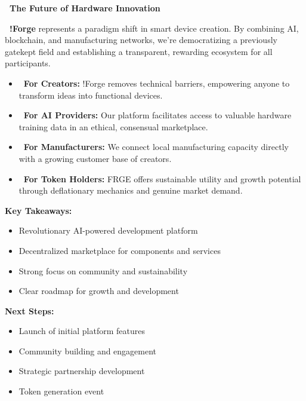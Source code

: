 \begin{center}
\large{\textcolor{fabPrimary}{\textbf{\faLightbulbO\ The Future of Hardware Innovation}}}
\end{center}

\vspace{0.5em}

\textbf{\textcolor{fabPrimary}{\faGears\ !Forge}} represents a paradigm shift in smart device creation. By combining AI, blockchain, and manufacturing networks, we're democratizing a previously gatekept field and establishing a transparent, rewarding ecosystem for all participants.

\vspace{0.5em}

\begin{itemize}[leftmargin=*]
    \item \textbf{\textcolor{fabPrimary}{\faUsers\ For Creators:}} !Forge removes technical barriers, empowering anyone to transform ideas into functional devices.
    
    \item \textbf{\textcolor{fabPrimary}{\faCog\ For AI Providers:}} Our platform facilitates access to valuable hardware training data in an ethical, consensual marketplace.
    
    \item \textbf{\textcolor{fabPrimary}{\faIndustry\ For Manufacturers:}} We connect local manufacturing capacity directly with a growing customer base of creators.
    
    \item \textbf{\textcolor{fabPrimary}{\faBitcoin\ For Token Holders:}} FRGE offers sustainable utility and growth potential through deflationary mechanics and genuine market demand.
\end{itemize}

\vspace{0.5em}

\begin{center}
\end{center}

\vspace{0.5cm}
\noindent\textbf{Key Takeaways:}
\begin{itemize}[leftmargin=*]
    \item Revolutionary AI-powered development platform
    \item Decentralized marketplace for components and services
    \item Strong focus on community and sustainability
    \item Clear roadmap for growth and development
\end{itemize}

\vspace{0.5cm}
\noindent\textbf{Next Steps:}
\begin{itemize}[leftmargin=*]
    \item Launch of initial platform features
    \item Community building and engagement
    \item Strategic partnership development
    \item Token generation event
\end{itemize}